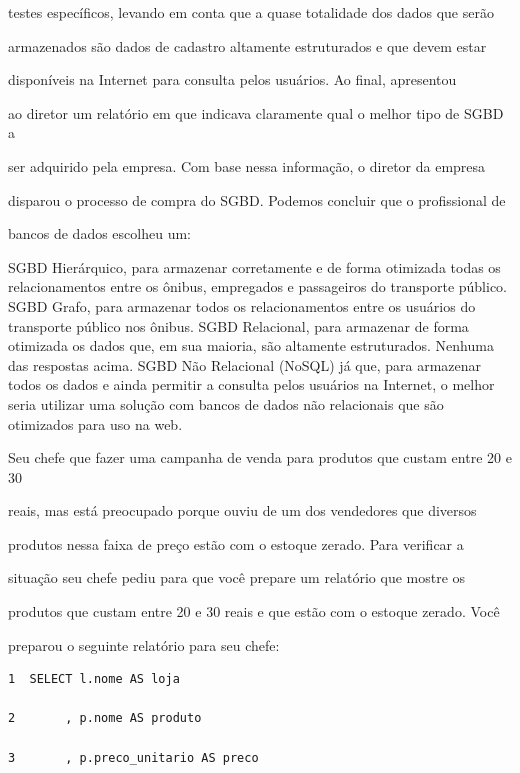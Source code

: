 \documentclass[12pt, addpoints]{exam}
\begin{document}
\begin{questions}
testes específicos, levando em conta que a quase totalidade dos dados que serão

armazenados são dados de cadastro altamente estruturados e que devem estar

disponíveis na Internet para consulta pelos usuários. Ao final, apresentou

ao diretor um relatório em que indicava claramente qual o melhor tipo de SGBD a

ser adquirido pela empresa. Com base nessa informação, o diretor da empresa

disparou o processo de compra do SGBD. Podemos concluir que o profissional de

bancos de dados escolheu um:
\begin{choices}
\choice SGBD Hierárquico, para armazenar corretamente e de forma otimizada todas os relacionamentos entre os ônibus, empregados e passageiros do transporte público.
\choice SGBD Grafo, para armazenar todos os relacionamentos entre os usuários do transporte público nos ônibus.
\choice SGBD Relacional, para armazenar de forma otimizada os dados que, em sua maioria, são altamente estruturados.
\choice Nenhuma das respostas acima.
\choice SGBD Não Relacional (NoSQL) já que, para armazenar todos os dados e ainda permitir a consulta pelos usuários na Internet, o melhor seria utilizar uma solução com bancos de dados não relacionais que são otimizados para uso na web.
\end{choices}

\question

Seu chefe que fazer uma campanha de venda para produtos que custam entre 20 e 30

reais, mas está preocupado porque ouviu de um dos vendedores que diversos

produtos nessa faixa de preço estão com o estoque zerado. Para verificar a

situação seu chefe pediu para que você prepare um relatório que mostre os

produtos que custam entre 20 e 30 reais e que estão com o estoque zerado. Você

preparou o seguinte relatório para seu chefe:

\begin{tcolorbox}

 \begin{verbatim}1  SELECT l.nome AS loja

2       , p.nome AS produto

3       , p.preco_unitario AS preco


\end{verbatim}
\end{tcolorbox}
\end{questions}
\end{document}
